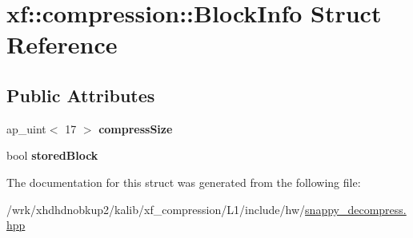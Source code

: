 \hypertarget{structxf_1_1compression_1_1BlockInfo}{\section{xf\-:\-:compression\-:\-:Block\-Info Struct Reference}
\label{structxf_1_1compression_1_1BlockInfo}
}
\subsection*{Public Attributes}
\begin{DoxyCompactItemize}
\item 
\hypertarget{structxf_1_1compression_1_1BlockInfo_a5a047270fafd37883e9864301ba875ce}{ap\-\_\-uint$<$ 17 $>$ {\bfseries compress\-Size}}\label{structxf_1_1compression_1_1BlockInfo_a5a047270fafd37883e9864301ba875ce}

\item 
\hypertarget{structxf_1_1compression_1_1BlockInfo_a7441cde438d96163a8dc49e8b0682c92}{bool {\bfseries stored\-Block}}\label{structxf_1_1compression_1_1BlockInfo_a7441cde438d96163a8dc49e8b0682c92}

\end{DoxyCompactItemize}


The documentation for this struct was generated from the following file\-:\begin{DoxyCompactItemize}
\item 
/wrk/xhdhdnobkup2/kalib/xf\-\_\-compression/\-L1/include/hw/\hyperlink{snappy__decompress_8hpp}{snappy\-\_\-decompress.\-hpp}\end{DoxyCompactItemize}

